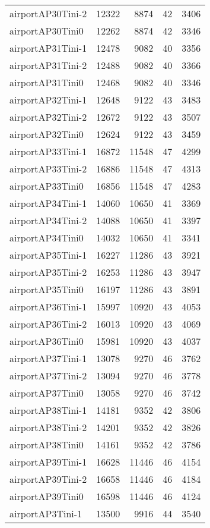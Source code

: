 \begin{longtable}{lrrrr}
airportAP30Tini-2 & 12322 & 8874 & 42 & 3406 \\
airportAP30Tini0 & 12262 & 8874 & 42 & 3346 \\
airportAP31Tini-1 & 12478 & 9082 & 40 & 3356 \\
airportAP31Tini-2 & 12488 & 9082 & 40 & 3366 \\
airportAP31Tini0 & 12468 & 9082 & 40 & 3346 \\
airportAP32Tini-1 & 12648 & 9122 & 43 & 3483 \\
airportAP32Tini-2 & 12672 & 9122 & 43 & 3507 \\
airportAP32Tini0 & 12624 & 9122 & 43 & 3459 \\
airportAP33Tini-1 & 16872 & 11548 & 47 & 4299 \\
airportAP33Tini-2 & 16886 & 11548 & 47 & 4313 \\
airportAP33Tini0 & 16856 & 11548 & 47 & 4283 \\
airportAP34Tini-1 & 14060 & 10650 & 41 & 3369 \\
airportAP34Tini-2 & 14088 & 10650 & 41 & 3397 \\
airportAP34Tini0 & 14032 & 10650 & 41 & 3341 \\
airportAP35Tini-1 & 16227 & 11286 & 43 & 3921 \\
airportAP35Tini-2 & 16253 & 11286 & 43 & 3947 \\
airportAP35Tini0 & 16197 & 11286 & 43 & 3891 \\
airportAP36Tini-1 & 15997 & 10920 & 43 & 4053 \\
airportAP36Tini-2 & 16013 & 10920 & 43 & 4069 \\
airportAP36Tini0 & 15981 & 10920 & 43 & 4037 \\
airportAP37Tini-1 & 13078 & 9270 & 46 & 3762 \\
airportAP37Tini-2 & 13094 & 9270 & 46 & 3778 \\
airportAP37Tini0 & 13058 & 9270 & 46 & 3742 \\
airportAP38Tini-1 & 14181 & 9352 & 42 & 3806 \\
airportAP38Tini-2 & 14201 & 9352 & 42 & 3826 \\
airportAP38Tini0 & 14161 & 9352 & 42 & 3786 \\
airportAP39Tini-1 & 16628 & 11446 & 46 & 4154 \\
airportAP39Tini-2 & 16658 & 11446 & 46 & 4184 \\
airportAP39Tini0 & 16598 & 11446 & 46 & 4124 \\
airportAP3Tini-1 & 13500 & 9916 & 44 & 3540 \\

\end{longtable}
